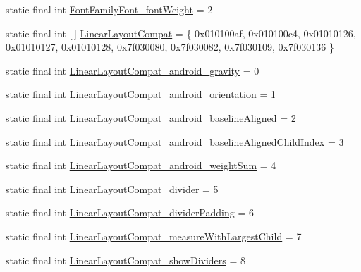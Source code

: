 \begin{DoxyCompactItemize}
\item 
static final int \mbox{\hyperlink{classandroid_1_1support_1_1v7_1_1appcompat_1_1R_1_1styleable_ac04ef33c0a0ab5c32746bbdd106b4f72}{Font\+Family\+Font\+\_\+font\+Weight}} = 2
\item 
static final int \mbox{[}$\,$\mbox{]} \mbox{\hyperlink{classandroid_1_1support_1_1v7_1_1appcompat_1_1R_1_1styleable_a765d32873526b8c36de14b184094582d}{Linear\+Layout\+Compat}} = \{ 0x010100af, 0x010100c4, 0x01010126, 0x01010127, 0x01010128, 0x7f030080, 0x7f030082, 0x7f030109, 0x7f030136 \}
\item 
static final int \mbox{\hyperlink{classandroid_1_1support_1_1v7_1_1appcompat_1_1R_1_1styleable_a202f5756f9ea1f3e59f081f08504f7cc}{Linear\+Layout\+Compat\+\_\+android\+\_\+gravity}} = 0
\item 
static final int \mbox{\hyperlink{classandroid_1_1support_1_1v7_1_1appcompat_1_1R_1_1styleable_aa0018fb5f7ace994511fa780754a9bde}{Linear\+Layout\+Compat\+\_\+android\+\_\+orientation}} = 1
\item 
static final int \mbox{\hyperlink{classandroid_1_1support_1_1v7_1_1appcompat_1_1R_1_1styleable_a1839a26136f1f9ec79878c1035eebed9}{Linear\+Layout\+Compat\+\_\+android\+\_\+baseline\+Aligned}} = 2
\item 
static final int \mbox{\hyperlink{classandroid_1_1support_1_1v7_1_1appcompat_1_1R_1_1styleable_a1e2dfafdd5b19904cd76f4e712341057}{Linear\+Layout\+Compat\+\_\+android\+\_\+baseline\+Aligned\+Child\+Index}} = 3
\item 
static final int \mbox{\hyperlink{classandroid_1_1support_1_1v7_1_1appcompat_1_1R_1_1styleable_ac4c2540eeae4dc81e94e057cf2ba0152}{Linear\+Layout\+Compat\+\_\+android\+\_\+weight\+Sum}} = 4
\item 
static final int \mbox{\hyperlink{classandroid_1_1support_1_1v7_1_1appcompat_1_1R_1_1styleable_a280f61ae8c1eaeaed66b529aaa9a0e56}{Linear\+Layout\+Compat\+\_\+divider}} = 5
\item 
static final int \mbox{\hyperlink{classandroid_1_1support_1_1v7_1_1appcompat_1_1R_1_1styleable_a590418ec37cda0b60e090e85aeaaaaf2}{Linear\+Layout\+Compat\+\_\+divider\+Padding}} = 6
\item 
static final int \mbox{\hyperlink{classandroid_1_1support_1_1v7_1_1appcompat_1_1R_1_1styleable_a2d49ec7be658708f20310983285edb54}{Linear\+Layout\+Compat\+\_\+measure\+With\+Largest\+Child}} = 7
\item 
static final int \mbox{\hyperlink{classandroid_1_1support_1_1v7_1_1appcompat_1_1R_1_1styleable_adfc38ee5928f010cbae4576b71478b52}{Linear\+Layout\+Compat\+\_\+show\+Dividers}} = 8

\end{DoxyCompactItemize}
